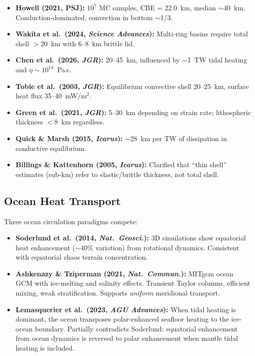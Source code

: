 \documentclass[11pt,letterpaper]{article}
\begin{document}
\begin{itemize}[nosep]
  \item \textbf{Howell (2021, PSJ):} $10^7$ MC samples, CBE = 22.0~km, median $\sim$40~km. Conduction-dominated, convection in bottom $\sim$1/3.
  \item \textbf{Wakita et al.\ (2024, \textit{Science Advances}):} Multi-ring basins require total shell $> 20$~km with 6--8~km brittle lid.
  \item \textbf{Chen et al.\ (2026, \textit{JGR}):} 20--45~km, influenced by $\sim$1~TW tidal heating and $\eta \sim 10^{14}$~Pa\,s.
  \item \textbf{Tobie et al.\ (2003, \textit{JGR}):} Equilibrium convective shell 20--25~km, surface heat flux 35--40~mW/m$^2$.
  \item \textbf{Green et al.\ (2021, \textit{JGR}):} 5--30~km depending on strain rate; lithospheric thickness $< 8$~km regardless.
  \item \textbf{Quick \& Marsh (2015, \textit{Icarus}):} $\sim$28~km per TW of dissipation in conductive equilibrium.
  \item \textbf{Billings \& Kattenhorn (2005, \textit{Icarus}):} Clarified that ``thin shell'' estimates (sub-km) refer to elastic/brittle thickness, not total shell.
\end{itemize}

\subsection{Ocean Heat Transport}

Three ocean circulation paradigms compete:

\begin{itemize}[nosep]
  \item \textbf{Soderlund et al.\ (2014, \textit{Nat.\ Geosci.}):} 3D simulations show equatorial heat enhancement ($\sim$40\% variation) from rotational dynamics. Consistent with equatorial chaos terrain concentration.
  \item \textbf{Ashkenazy \& Tziperman (2021, \textit{Nat.\ Commun.}):} MITgcm ocean GCM with ice-melting and salinity effects. Transient Taylor columns, efficient mixing, weak stratification. Supports \textit{uniform} meridional transport.
  \item \textbf{Lemasquerier et al.\ (2023, \textit{AGU Advances}):} When tidal heating is dominant, the ocean transposes polar-enhanced seafloor heating to the ice-ocean boundary. Partially contradicts Soderlund: equatorial enhancement from ocean dynamics is reversed to polar enhancement when mantle tidal heating is included.
\end{itemize}
\end{document}
